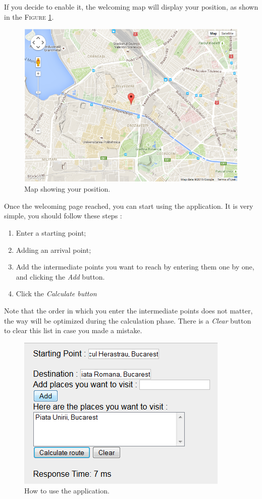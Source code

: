 		If you decide to enable it, the welcoming map will display your position, as shown in the \textsc{Figure} \ref{fig:geoloc_map}.
		\begin{figure}[h!]
			\centering
			\includegraphics[scale=0.7]{input/geoloc_map.png}
			\caption{\label{fig:geoloc_map}Map showing your position.}
		\end{figure}
		
		Once the welcoming page reached, you can start using the application. It is very simple, you should follow these steps :
		\begin{enumerate}
			\item Enter a starting point;
			\item Adding an arrival point;
			\item Add the intermediate points you want to reach by entering them one by one, and clicking the \textit{Add} button.
			\item Click the \textit{Calculate button}
		\end{enumerate}
		Note that the order in which you enter the intermediate points does not matter, the way will be optimized during the calculation phase.
		There is a \textit{Clear} button to clear this list in case you made a mistake.
		
		\begin{figure}[h!]
			\centering
			\includegraphics[scale=0.7]{input/make_route.png}
			\caption{\label{fig:route}How to use the application.}
		\end{figure}
		
